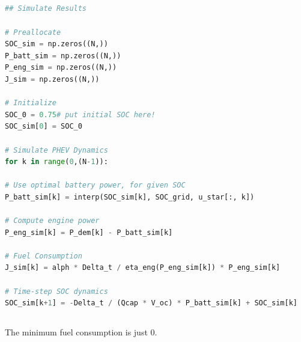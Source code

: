\documentclass[12pt]{article}
\begin{document}
\subsection{}
\begin{lstlisting}[language=Python]
## Simulate Results

# Preallocate
SOC_sim = np.zeros((N,))
P_batt_sim = np.zeros((N,))
P_eng_sim = np.zeros((N,))
J_sim = np.zeros((N,))

# Initialize
SOC_0 = 0.75# put initial SOC here!
SOC_sim[0] = SOC_0

# Simulate PHEV Dynamics
for k in range(0,(N-1)):

# Use optimal battery power, for given SOC
P_batt_sim[k] = interp(SOC_sim[k], SOC_grid, u_star[:, k])

# Compute engine power
P_eng_sim[k] = P_dem[k] - P_batt_sim[k]

# Fuel Consumption
J_sim[k] = alph * Delta_t / eta_eng(P_eng_sim[k]) * P_eng_sim[k]

# Time-step SOC dynamics
SOC_sim[k+1] = -Delta_t / (Qcap * V_oc) * P_batt_sim[k] + SOC_sim[k]
\end{lstlisting}
\subsection{}
The minimum fuel consumption is just 0.
\newpage
\end{document}
